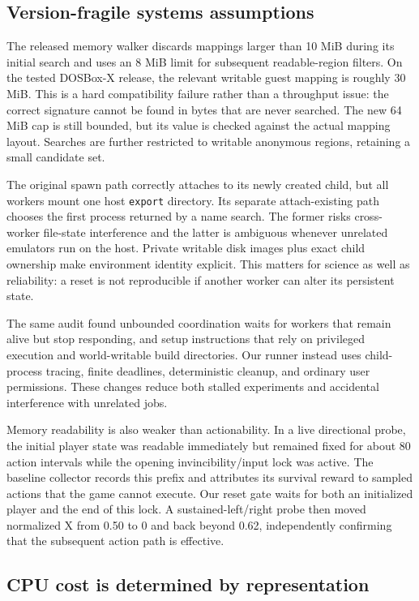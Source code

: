 \documentclass[10pt]{article}
\begin{document}
\subsection{Version-fragile systems assumptions}

The released memory walker discards mappings larger than 10 MiB during its
initial search and uses an 8 MiB limit for subsequent readable-region filters.
On the tested DOSBox-X release, the relevant writable guest mapping is roughly
30 MiB.  This is a hard compatibility failure rather than a throughput issue:
the correct signature cannot be found in bytes that are never searched.  The
new 64 MiB cap is still bounded, but its value is checked against the actual
mapping layout.  Searches are further restricted to writable anonymous
regions, retaining a small candidate set.

The original spawn path correctly attaches to its newly created child, but all
workers mount one host \texttt{export} directory.  Its separate attach-existing
path chooses the first process returned by a name search.  The former risks
cross-worker file-state interference and the latter is ambiguous whenever
unrelated emulators run on the host.  Private writable disk images plus exact
child ownership make environment identity explicit.  This matters for science
as well as reliability: a reset is not reproducible if another worker can alter
its persistent state.

The same audit found unbounded coordination waits for workers that remain alive
but stop responding, and setup instructions that rely on privileged execution
and world-writable build directories.  Our runner instead uses child-process
tracing, finite deadlines, deterministic cleanup, and ordinary user
permissions.  These changes reduce both stalled experiments and accidental
interference with unrelated jobs.

Memory readability is also weaker than actionability.  In a live directional
probe, the initial player state was readable immediately but remained fixed for
about 80 action intervals while the opening invincibility/input lock was active.
The baseline collector records this prefix and attributes its survival reward
to sampled actions that the game cannot execute.  Our reset gate waits for both
an initialized player and the end of this lock.  A sustained-left/right probe
then moved normalized X from 0.50 to 0 and back beyond 0.62, independently
confirming that the subsequent action path is effective.

\subsection{CPU cost is determined by representation}
\end{document}
